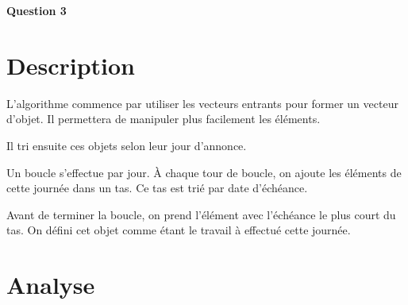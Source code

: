 \documentclass[class=article]{standalone}
\begin{document}
\centerline{\Huge \bf Question 3}
\bigskip

\section*{Description}
L'algorithme commence par utiliser les vecteurs entrants pour former un vecteur d'objet. 
Il permettera de manipuler plus facilement les éléments.

Il tri ensuite ces objets selon leur jour d'annonce.

Un boucle s'effectue par jour. À chaque tour de boucle, on ajoute les éléments de cette journée dans un tas.
Ce tas est trié par date d'échéance.

Avant de terminer la boucle, on prend l'élément avec l'échéance le plus court du tas. 
On défini cet objet comme étant le travail à effectué cette journée.

\section*{Analyse}
\end{document}
